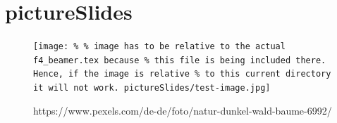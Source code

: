 \section{pictureSlides}

\begin{frame}
    \begin{figure}[htp]
        \centering
        \texttt{[image: \%
            \% image has to be relative to the actual f4\_beamer.tex because
            \% this file is being included there. Hence, if the image is relative
            \% to this current directory it will not work.
            pictureSlides/test-image.jpg]}
        \caption{%
            https://www.pexels.com/de-de/foto/natur-dunkel-wald-baume-6992/
        }
    \end{figure}
\end{frame}


